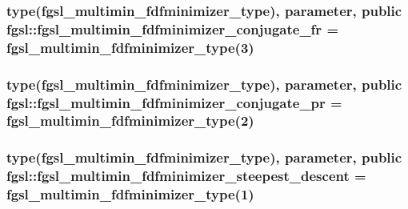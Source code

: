 \subsubsection[{fgsl\+\_\+multimin\+\_\+fdfminimizer\+\_\+conjugate\+\_\+fr}]{\setlength{\rightskip}{0pt plus 5cm}type({\bf fgsl\+\_\+multimin\+\_\+fdfminimizer\+\_\+type}), parameter, public fgsl\+::fgsl\+\_\+multimin\+\_\+fdfminimizer\+\_\+conjugate\+\_\+fr = {\bf fgsl\+\_\+multimin\+\_\+fdfminimizer\+\_\+type}(3)}\label{namespacefgsl_a94fc756d777c9358f808374b01e6a879}
\hypertarget{namespacefgsl_a8ac392b0c99b65482d4a3f6a8f719ed6}{}
\subsubsection[{fgsl\+\_\+multimin\+\_\+fdfminimizer\+\_\+conjugate\+\_\+pr}]{\setlength{\rightskip}{0pt plus 5cm}type({\bf fgsl\+\_\+multimin\+\_\+fdfminimizer\+\_\+type}), parameter, public fgsl\+::fgsl\+\_\+multimin\+\_\+fdfminimizer\+\_\+conjugate\+\_\+pr = {\bf fgsl\+\_\+multimin\+\_\+fdfminimizer\+\_\+type}(2)}\label{namespacefgsl_a8ac392b0c99b65482d4a3f6a8f719ed6}
\hypertarget{namespacefgsl_a30855ab98d924e9fa284bc2d50170b82}{}
\subsubsection[{fgsl\+\_\+multimin\+\_\+fdfminimizer\+\_\+steepest\+\_\+descent}]{\setlength{\rightskip}{0pt plus 5cm}type({\bf fgsl\+\_\+multimin\+\_\+fdfminimizer\+\_\+type}), parameter, public fgsl\+::fgsl\+\_\+multimin\+\_\+fdfminimizer\+\_\+steepest\+\_\+descent = {\bf fgsl\+\_\+multimin\+\_\+fdfminimizer\+\_\+type}(1)}\label{namespacefgsl_a30855ab98d924e9fa284bc2d50170b82}
\hypertarget{namespacefgsl_a98f35d82aab613681b886c2582cb98d2}{}
